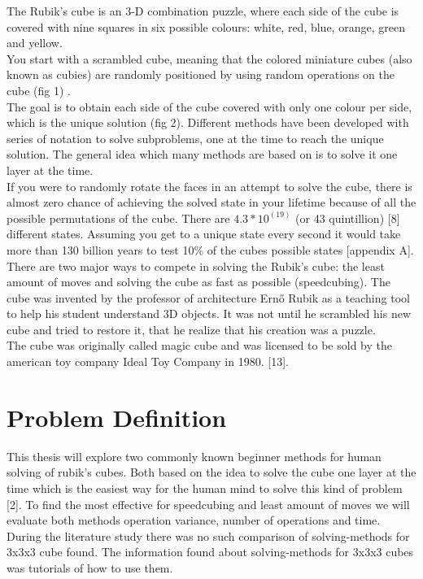 \documentclass[a4paper,11pt]{kth-mag}
\begin{document}
The Rubik’s cube is an 3-D combination puzzle, where each side of the cube is covered with nine squares in six possible colours: white, red, blue, orange, green and yellow.\\
You start with a scrambled cube, meaning that the colored miniature cubes (also known as cubies) are randomly positioned by using random operations on the cube (fig 1) . \\
The goal is to obtain each side of the cube covered with only one colour per side, which is the unique solution (fig 2). 
Different methods have been developed with series of notation to solve subproblems, one at the time to reach the unique solution. The general idea which many methods are based on is to solve it one layer at the time.\\
If you were to randomly rotate the faces in an attempt to solve the cube, there is almost zero chance of achieving the solved state in your lifetime because of all the possible permutations of the cube. There are $4.3 * 10^(19)$ (or 43 quintillion) [8] different states. Assuming you get to a unique state every second it would take more than 130 billion years to test 10\% of the cubes possible states [appendix A].\\
There are two major ways to compete in solving the Rubik’s cube: the least amount of moves and solving the cube as fast as possible (speedcubing).
The cube was invented by the professor of architecture Ernő Rubik as a teaching tool to help his student understand 3D objects. It was not until he scrambled his new cube and tried to restore it, that he realize that his creation was a puzzle.\\ 
The cube was originally called magic cube and was licensed to be sold by the american toy company Ideal Toy Company in 1980. [13].


\section{Problem Definition}
This thesis will explore two commonly known beginner methods for human solving of rubik’s cubes. Both based on the idea to solve the cube one layer at the time which is the easiest way for the human mind to solve this kind of problem [2]. To find the most effective for speedcubing and least amount of moves we will evaluate both methods operation variance, number of operations and time.\\

During the literature study there was no such comparison of solving-methods for 3x3x3 cube found. The information found about solving-methods for 3x3x3 cubes was tutorials of how to use them.
\end{document}
